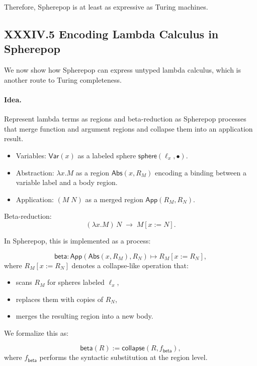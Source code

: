 \documentclass[12pt,letterpaper]{article}
\begin{document}
Therefore, Spherepop is at least as expressive as Turing machines.

\subsection{XXXIV.5 Encoding Lambda Calculus in Spherepop}

We now show how Spherepop can express untyped lambda calculus, which is another route to Turing completeness.

\paragraph{Idea.} Represent lambda terms as regions and beta-reduction as Spherepop processes that merge function and argument regions and collapse them into an application result.

\begin{itemize}
  \item Variables: $\mathsf{Var}(x)$ as a labeled sphere $\mathsf{sphere}(\ell_x, \bullet)$.
  \item Abstraction: $\lambda x. M$ as a region $\mathsf{Abs}(x, R_M)$ encoding a binding between a variable label and a body region.
  \item Application: $(M\;N)$ as a merged region $\mathsf{App}(R_M, R_N)$.
\end{itemize}

Beta-reduction:
\[
(\lambda x. M)\,N \;\to\; M[x := N].
\]

In Spherepop, this is implemented as a process:

\[
\mathsf{beta} :
\mathsf{App}(\mathsf{Abs}(x, R_M), R_N)
\mapsto
R_M[x := R_N],
\]
where $R_M[x := R_N]$ denotes a collapse-like operation that:

\begin{itemize}
  \item scans $R_M$ for spheres labeled $\ell_x$,
  \item replaces them with copies of $R_N$,
  \item merges the resulting region into a new body.
\end{itemize}

We formalize this as:

\[
\mathsf{beta}(R) := \mathsf{collapse}(R, f_{\mathsf{beta}}),
\]
where $f_{\mathsf{beta}}$ performs the syntactic substitution at the region level.
\end{document}

